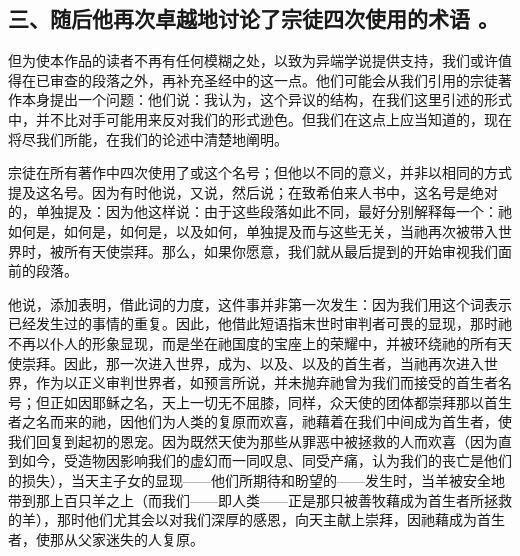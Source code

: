 
\subsection{三、随后他再次卓越地讨论了宗徒四次使用的术语 。}

但为使本作品的读者不再有任何模糊之处，以致为异端学说提供支持，我们或许值得在已审查的段落之外，再补充圣经中的这一点。他们可能会从我们引用的宗徒著作本身提出一个问题：他们说：我认为，这个异议的结构，在我们这里引述的形式中，并不比对手可能用来反对我们的形式逊色。但我们在这点上应当知道的，现在将尽我们所能，在我们的论述中清楚地阐明。\par

宗徒在所有著作中四次使用了或这个名号；但他以不同的意义，并非以相同的方式提及这名号。因为有时他说，又说，然后说；在致希伯来人书中，这名号是绝对的，单独提及：因为他这样说：由于这些段落如此不同，最好分别解释每一个：祂如何是，如何是，如何是，以及如何，单独提及而与这些无关，当祂再次被带入世界时，被所有天使崇拜。那么，如果你愿意，我们就从最后提到的开始审视我们面前的段落。\par

他说，添加表明，借此词的力度，这件事并非第一次发生：因为我们用这个词表示已经发生过的事情的重复。因此，他借此短语指末世时审判者可畏的显现，那时祂不再以仆人的形象显现，而是坐在祂国度的宝座上的荣耀中，并被环绕祂的所有天使崇拜。因此，那一次进入世界，成为、以及、以及的首生者，当祂再次进入世界，作为以正义审判世界者，如预言所说，并未抛弃祂曾为我们而接受的首生者名号；但正如因耶稣之名，天上一切无不屈膝，同样，众天使的团体都崇拜那以首生者之名而来的祂，因他们为人类的复原而欢喜，祂藉着在我们中间成为首生者，使我们回复到起初的恩宠。因为既然天使为那些从罪恶中被拯救的人而欢喜（因为直到如今，受造物因影响我们的虚幻而一同叹息、同受产痛，认为我们的丧亡是他们的损失），当天主子女的显现——他们所期待和盼望的——发生时，当羊被安全地带到那上百只羊之上（而我们——即人类——正是那只被善牧藉成为首生者所拯救的羊），那时他们尤其会以对我们深厚的感恩，向天主献上崇拜，因祂藉成为首生者，使那从父家迷失的人复原。\par

